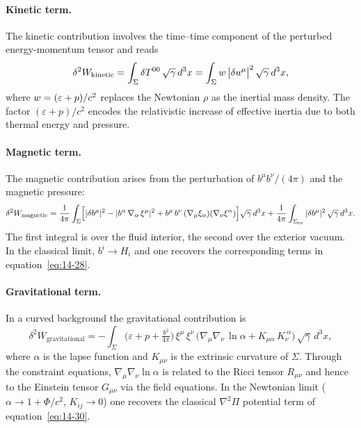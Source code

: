 \paragraph{Kinetic term.}
The kinetic contribution involves the time--time component of the
perturbed energy-momentum tensor and reads
\begin{equation}
  \delta^{2}W_{\mathrm{kinetic}}
  = \int_{\Sigma}
    \delta T^{00}\,\sqrt{\gamma}\,d^{3}x
  = \int_{\Sigma}
    w\,\bigl|\delta u^{\mu}\bigr|^{2}\,
    \sqrt{\gamma}\,d^{3}x,
  \label{eq:rel14-W-kinetic}
\end{equation}
where $w = (\varepsilon+p)/c^{2}$ replaces the Newtonian $\rho$
as the inertial mass density.  The factor
$(\varepsilon+p)/c^{2}$ encodes the relativistic increase of
effective inertia due to both thermal energy and pressure.

\paragraph{Magnetic term.}
The magnetic contribution arises from the perturbation of
$b^{\mu}b^{\nu}/(4\pi)$ and the magnetic pressure:
\begin{equation}
  \delta^{2}W_{\mathrm{magnetic}}
  = \frac{1}{4\pi}\int_{\Sigma}\Bigl[
      |\delta b^{\mu}|^{2}
    - |b^{\alpha}\,\nabla_{\alpha}\,\xi^{\mu}|^{2}
    + b^{\mu}\,b^{\nu}\,
      (\nabla_{\mu}\xi_{\alpha})(\nabla_{\nu}\xi^{\alpha})
    \Bigr]\sqrt{\gamma}\,d^{3}x
  + \frac{1}{4\pi}\int_{\Sigma_{\mathrm{ex}}}
    |\delta b^{\mu}|^{2}\,\sqrt{\gamma}\,d^{3}x.
  \label{eq:rel14-W-magnetic}
\end{equation}
The first integral is over the fluid interior, the second over the
exterior vacuum.  In the classical limit, $b^{i}\to H_{i}$ and one
recovers the corresponding terms in equation~\eqref{eq:14-28}.

\paragraph{Gravitational term.}
In a curved background the gravitational contribution is
\begin{equation}
  \delta^{2}W_{\mathrm{gravitational}}
  = -\int_{\Sigma}
    \bigl(\varepsilon + p + \tfrac{b^{2}}{4\pi}\bigr)\,
    \xi^{\mu}\,\xi^{\nu}\,
    \bigl(\nabla_{\mu}\nabla_{\nu}\,\ln\alpha
      + K_{\mu\alpha}\,K_{\nu}^{\ \alpha}\bigr)\,
    \sqrt{\gamma}\,d^{3}x,
  \label{eq:rel14-W-gravity}
\end{equation}
where $\alpha$ is the lapse function and $K_{\mu\nu}$ is the
extrinsic curvature of $\Sigma$.  Through the constraint equations,
$\nabla_{\mu}\nabla_{\nu}\ln\alpha$ is related to the Ricci tensor
$R_{\mu\nu}$ and hence to the Einstein tensor $G_{\mu\nu}$ via the
field equations.  In the Newtonian limit ($\alpha\to 1 + \Phi/c^{2}$,
$K_{ij}\to 0$) one recovers the classical $\nabla^{2}\Pi$ potential
term of equation~\eqref{eq:14-30}.

